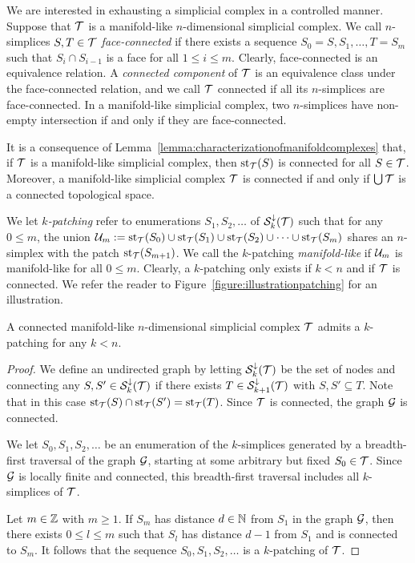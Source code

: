 \documentclass[10pt,a4paper]{article}
\begin{document}
We are interested in exhausting a simplicial complex in a controlled manner. 
Suppose that ${\mathcal T}$ is a manifold-like $n$-dimensional simplicial complex. 
We call $n$-simplices $S,T \in {\mathcal T}$ \emph{face-connected} if there exists a sequence $S_0=S,S_1,\dots,T=S_m$ such that $S_{i} \cap S_{i-1}$ is a face for all $1 \leq i \leq m$. Clearly, face-connected is an equivalence relation. A \emph{connected component} of ${\mathcal T}$ is an equivalence class under the face-connected relation, and we call ${\mathcal T}$ connected if all its $n$-simplices are face-connected. 
In a manifold-like simplicial complex, two $n$-simplices have non-empty intersection if and only if they are face-connected. 

It is a consequence of Lemma~\ref{lemma:characterizationofmanifoldcomplexes} that,
if ${\mathcal T}$ is a manifold-like simplicial complex, then $\operatorname{st}_{{\mathcal T}}(S)$ is connected for all $S \in {\mathcal T}$.
Moreover, a manifold-like simplicial complex ${\mathcal T}$ is connected if and only if $\bigcup{\mathcal T}$ is a connected topological space. 

We let \emph{$k$-patching} refer to enumerations $S_1, S_2, \dots$ of ${\mathcal S}^{\downarrow}_{k}({\mathcal T})$
such that for any $0 \leq m$, the union 
${\mathcal U}_{m} := \operatorname{st}_{{\mathcal T}}(S_0) \cup \operatorname{st}_{{\mathcal T}}(S_1) \cup \operatorname{st}_{{\mathcal T}}(S_2) \cup \dots \cup \operatorname{st}_{{\mathcal T}}(S_m)$
shares an $n$-simplex with the patch $\operatorname{st}_{{\mathcal T}}(S_{m+1})$.
We call the $k$-patching \emph{manifold-like} if ${\mathcal U}_{m}$ is manifold-like for all $0 \leq m$.
Clearly, a $k$-patching only exists if $k < n$ and if ${\mathcal T}$ is connected. 
We refer the reader to Figure~\ref{figure:illustrationpatching} for an illustration.

\begin{lemma}
    A connected manifold-like $n$-dimensional simplicial complex ${\mathcal T}$ admits a $k$-patching for any $k < n$.
\end{lemma}
\begin{proof}
    We define an undirected graph by letting ${\mathcal S}^{\downarrow}_{k}({\mathcal T})$ be the set of nodes 
    and connecting any $S, S' \in {\mathcal S}^{\downarrow}_{k}({\mathcal T})$ if there exists $T \in {\mathcal S}^{\downarrow}_{k+1}({\mathcal T})$ with $S, S' \subseteq T$. 
    Note that in this case $\operatorname{st}_{{\mathcal T}}(S) \cap \operatorname{st}_{{\mathcal T}}(S') = \operatorname{st}_{{\mathcal T}}(T)$. 
    Since ${\mathcal T}$ is connected, the graph ${\mathcal G}$ is connected. 
    
    We let $S_0, S_1, S_2, \dots$ be an enumeration of the $k$-simplices generated by a breadth-first traversal of the graph ${\mathcal G}$,
    starting at some arbitrary but fixed $S_0 \in {\mathcal T}$. 
    Since ${\mathcal G}$ is locally finite and connected, 
    this breadth-first traversal includes all $k$-simplices of ${\mathcal T}$.
    
    Let $m \in {\mathbb Z}$ with $m \geq 1$. If $S_m$ has distance $d \in {\mathbb N}$ from $S_1$ in the graph ${\mathcal G}$,
    then there exists $0 \leq l \leq m$ such that $S_l$ has distance $d-1$ from $S_1$ and is connected to $S_m$. 
    It follows that the sequence $S_0, S_1, S_2, \dots$ is a $k$-patching of ${\mathcal T}$. 
\end{proof}
\end{document}
